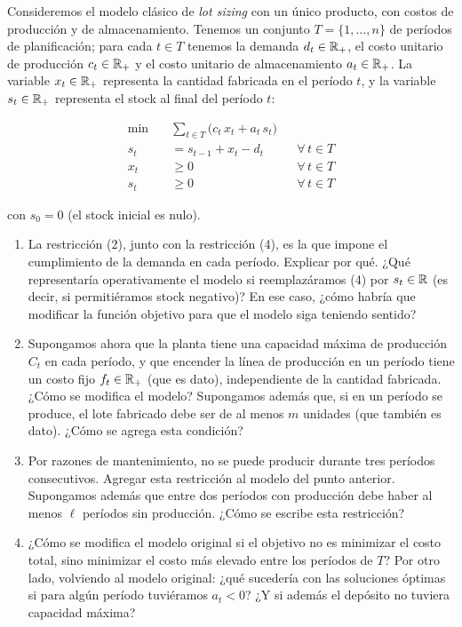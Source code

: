 \documentclass[11pt,a4paper]{article}
\begin{document}

Consideremos el modelo clásico de \emph{lot sizing} con un único producto, con
costos de producción y de almacenamiento. Tenemos un conjunto
$T = \{1,\dots,n\}$ de períodos de planificación; para cada $t \in T$ tenemos la
demanda $d_t \in \mathbb{R}_+$, el costo unitario de producción $c_t \in \mathbb{R}_+$ y el costo
unitario de almacenamiento $a_t \in \mathbb{R}_+$. La variable $x_t \in \mathbb{R}_+$ representa
la cantidad fabricada en el período $t$, y la variable $s_t \in \mathbb{R}_+$ representa
el stock al final del período $t$:

\begin{align}
\min \quad & \sum_{t \in T} \big( c_t\, x_t + a_t\, s_t \big) \\
s_t &= s_{t-1} + x_t - d_t && \forall\, t \in T \\
x_t &\ge 0 && \forall\, t \in T \\
s_t &\ge 0 && \forall\, t \in T
\end{align}

con $s_0 = 0$ (el stock inicial es nulo).

\begin{enumerate}
  \item La restricción (2), junto con la restricción (4), es la que impone el
  cumplimiento de la demanda en cada período. Explicar por qué. ¿Qué
  representaría operativamente el modelo si reemplazáramos (4) por
  $s_t \in \mathbb{R}$ (es decir, si permitiéramos stock negativo)? En ese caso,
  ¿cómo habría que modificar la función objetivo para que el modelo siga
  teniendo sentido?

  \item Supongamos ahora que la planta tiene una capacidad máxima de producción
  $C_t$ en cada período, y que encender la línea de producción en un período
  tiene un costo fijo $f_t \in \mathbb{R}_+$ (que es dato), independiente de la cantidad
  fabricada. ¿Cómo se modifica el modelo? Supongamos además que, si en un
  período se produce, el lote fabricado debe ser de al menos $m$ unidades
  (que también es dato). ¿Cómo se agrega esta condición?

  \item Por razones de mantenimiento, no se puede producir durante tres períodos
  consecutivos. Agregar esta restricción al modelo del punto anterior.
  Supongamos además que entre dos períodos con producción debe haber al menos
  $\ell$ períodos sin producción. ¿Cómo se escribe esta restricción?

  \item ¿Cómo se modifica el modelo original si el objetivo no es minimizar el
  costo total, sino minimizar el costo más elevado entre los períodos de $T$?
  Por otro lado, volviendo al modelo original: ¿qué sucedería con las soluciones
  óptimas si para algún período tuviéramos $a_t < 0$? ¿Y si además el depósito
  no tuviera capacidad máxima?
\end{enumerate}
\end{document}
